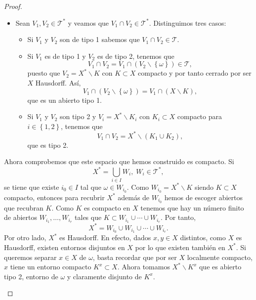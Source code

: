 \begin{proof}
\begin{enumerate}
\begin{itemize}
\item Sean $\displaystyle V_{1}, V_{2}\in \mathcal{T}^{*} $ y veamos que $\displaystyle V_{1}\cap V_{2}\in \mathcal{T}^{*} $. Distinguimos tres casos:
	\begin{itemize}
	\item Si $\displaystyle V_{1} $ y $\displaystyle V_{2} $ son de tipo 1 sabemos que $\displaystyle V_{1}\cap V_{2}\in \mathcal{T} $.
	\item Si $\displaystyle V_{1} $ es de tipo 1 y $\displaystyle V_{2} $ es de tipo 2, tenemos que 
		\[V_{1}\cap V_{2} = V_{1}\cap \left(V_{2} \backslash \left\{ \omega \right\} \right)\in \mathcal{T} ,\]
		puesto que $\displaystyle V_{2}= X^{*}\backslash K $ con $\displaystyle K\subset X $ compacto y por tanto cerrado por ser $\displaystyle X $ Hausdorff. Así, 
		\[V_{1}\cap\left(V_{2} \backslash \left\{ \omega \right\} \right)=V_{1}\cap \left(X\backslash K\right) ,\]
		que es un abierto tipo 1.
	\item Si $\displaystyle V_{1} $ y $\displaystyle V_{2} $ son tipo 2 y $\displaystyle V_{i}=X^{*}\backslash K_{i} $ con $\displaystyle K_{i}\subset X $ compacto para $\displaystyle i \in \left\{ 1,2\right\}  $, tenemos que 
		\[V_{1}\cap V_{2}=X^{*}\backslash \left(K_{1}\cup K_{2}\right) ,\]
		que es tipo 2.
	\end{itemize}
	\end{itemize}
Ahora comprobemos que este espacio que hemos construido es compacto. Si 
\[X^{*}=\bigcup_{i \in I}W_{i}, \; W_{i}\in \mathcal{T}^{*} ,\]
se tiene que existe $\displaystyle i_{0}\in I $ tal que $\displaystyle \omega \in W_{i_{0}} $. Como $\displaystyle W_{i_{0}}= X^{*}\backslash K $ siendo $\displaystyle K \subset X $ compacto, entonces para recubrir $\displaystyle X^{*} $ además de $\displaystyle W_{i_{0}} $ hemos de escoger abiertos que recubran $\displaystyle K $. Como $\displaystyle K $ es compacto en $\displaystyle X $ tenemos que hay un número finito de abiertos $\displaystyle W_{i_{1}}, \ldots, W_{i_{r}} $ tales que $\displaystyle K \subset W_{i_{1}} \cup \cdots \cup W_{i_{r}} $. Por tanto, 
\[X^{*}=W_{i_{0}}\cup W_{i_{1}}\cup \cdots \cup W_{i_{r}} .\]
Por otro lado, $\displaystyle X^{*} $ es Hausdorff. En efecto, dados $\displaystyle x ,y\in X $ distintos, como $\displaystyle X $ es Hausdorff, existen entornos disjuntos en $\displaystyle X $ por lo que existen también en $\displaystyle X^{*} $. Si queremos separar $\displaystyle x \in X $ de $\displaystyle \omega  $, basta recordar que 
por ser $\displaystyle X $ localmente compacto, $\displaystyle x  $ tiene un entorno compacto $\displaystyle K^{x}\subset X $. Ahora tomamos $\displaystyle X^{*}\backslash K^{x} $ que es abierto tipo 2, entorno de $\displaystyle \omega  $ y claramente disjunto de $\displaystyle K^{x} $. \\

\end{enumerate}
\end{proof}

